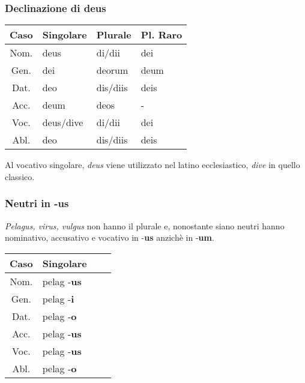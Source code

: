 \subsubsection*{Declinazione di deus}
\begin{table}[h!]
    \centering
    \begin{tabular}{|c|l|l|l|}
        \hline
        \textbf{Caso} & \textbf{Singolare} & \textbf{Plurale} & \textbf{Pl. Raro}\\
        \hline
        Nom. & deus & di/dii & dei \\
        \hline
        Gen. & dei  & deorum & deum \\
        \hline
        Dat. & deo  & dis/diis & deis \\
        \hline
        Acc. & deum & deos & - \\
        \hline
        Voc. & deus/dive & di/dii & dei \\
        \hline
        Abl. & deo  & dis/diis & deis \\
        \hline
    \end{tabular}
\end{table}

Al vocativo singolare, \textit{deus} viene utilizzato nel latino ecclesiastico, \textit{dive} in quello classico.
\subsubsection*{Neutri in -us}
\textit{Pelagus, virus, vulgus} non hanno il plurale e, nonostante siano neutri hanno nominativo,
accusativo e vocativo in -\textbf{us} anzich\`e in -\textbf{um}.

\begin{table}[h!]
    \centering
    \begin{tabular}{|c|l|l|l|}
        \hline
        \textbf{Caso} & \textbf{Singolare} \\
        \hline
        Nom. & pelag -\textbf{us} \\
        \hline
        Gen. & pelag -\textbf{i} \\
        \hline
        Dat. & pelag -\textbf{o} \\
        \hline
        Acc. & pelag -\textbf{us} \\
        \hline
        Voc. & pelag -\textbf{us} \\
        \hline
        Abl. & pelag -\textbf{o} \\
        \hline
    \end{tabular}
\end{table}

\clearpage

